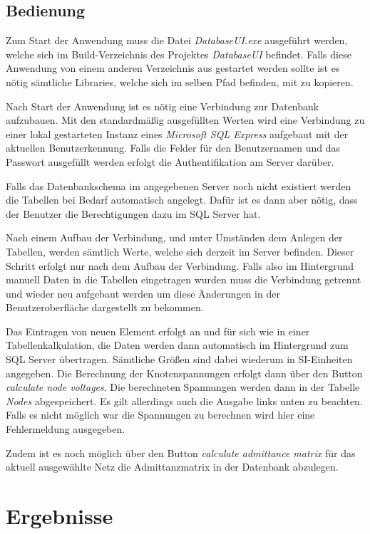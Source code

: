 \documentclass[12pt,a4paper]{article}
\begin{document}
	\subsection{Bedienung}
	Zum Start der Anwendung muss die Datei \emph{DatabaseUI.exe} ausgeführt werden, welche sich im Build-Verzeichnis des Projektes \emph{DatabaseUI} befindet. Falls diese Anwendung von einem anderen Verzeichnis aus gestartet werden sollte ist es nötig sämtliche Libraries, welche sich im selben Pfad befinden, mit zu kopieren.
	
	Nach Start der Anwendung ist es nötig eine Verbindung zur Datenbank aufzubauen. Mit den standardmäßig ausgefüllten Werten wird eine Verbindung zu einer lokal gestarteten Instanz eines \emph{Microsoft SQL Express} aufgebaut mit der aktuellen Benutzerkennung. Falls die Felder für den Benutzernamen und das Passwort ausgefüllt werden erfolgt die Authentifikation am Server darüber.
	
	Falls das Datenbankschema im angegebenen Server noch nicht existiert werden die Tabellen bei Bedarf automatisch angelegt. Dafür ist es dann aber nötig, dass der Benutzer die Berechtigungen dazu im SQL Server hat.
	
	Nach einem Aufbau der Verbindung, und unter Umständen dem Anlegen der Tabellen, werden sämtlich Werte, welche sich derzeit im Server befinden. Dieser Schritt erfolgt nur nach dem Aufbau der Verbindung. Falls also im Hintergrund manuell Daten in die Tabellen eingetragen wurden muss die Verbindung getrennt und wieder neu aufgebaut werden um diese Änderungen in der Benutzeroberfläche dargestellt zu bekommen.
	
	Das Eintragen von neuen Element erfolgt an und für sich wie in einer Tabellenkalkulation, die Daten werden dann automatisch im Hintergrund zum SQL Server übertragen. Sämtliche Größen sind dabei wiederum in SI-Einheiten angegeben. Die Berechnung der Knotenspannungen erfolgt dann über den Button \emph{calculate node voltages}. Die berechneten Spannungen werden dann in der Tabelle \emph{Nodes} abgespeichert. Es gilt allerdings auch die Ausgabe links unten zu beachten. Falls es nicht möglich war die Spannungen zu berechnen wird hier eine Fehlermeldung ausgegeben.
	
	Zudem ist es noch möglich über den Button \emph{calculate admittance matrix} für das aktuell ausgewählte Netz die Admittanzmatrix in der Datenbank abzulegen.
	
	\section{Ergebnisse}
	
\end{document}
